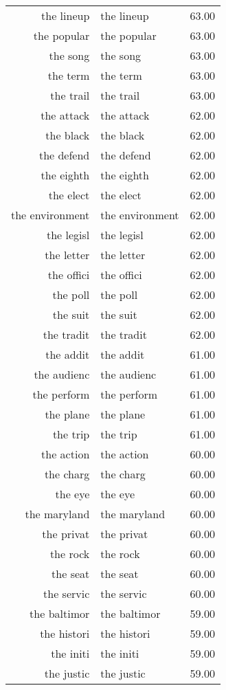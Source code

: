 \begin{table}[ht]
\begin{tabular}{rlr}
  the lineup & the lineup & 63.00 \\ 
  the popular & the popular & 63.00 \\ 
  the song & the song & 63.00 \\ 
  the term & the term & 63.00 \\ 
  the trail & the trail & 63.00 \\ 
  the attack & the attack & 62.00 \\ 
  the black & the black & 62.00 \\ 
  the defend & the defend & 62.00 \\ 
  the eighth & the eighth & 62.00 \\ 
  the elect & the elect & 62.00 \\ 
  the environment & the environment & 62.00 \\ 
  the legisl & the legisl & 62.00 \\ 
  the letter & the letter & 62.00 \\ 
  the offici & the offici & 62.00 \\ 
  the poll & the poll & 62.00 \\ 
  the suit & the suit & 62.00 \\ 
  the tradit & the tradit & 62.00 \\ 
  the addit & the addit & 61.00 \\ 
  the audienc & the audienc & 61.00 \\ 
  the perform & the perform & 61.00 \\ 
  the plane & the plane & 61.00 \\ 
  the trip & the trip & 61.00 \\ 
  the action & the action & 60.00 \\ 
  the charg & the charg & 60.00 \\ 
  the eye & the eye & 60.00 \\ 
  the maryland & the maryland & 60.00 \\ 
  the privat & the privat & 60.00 \\ 
  the rock & the rock & 60.00 \\ 
  the seat & the seat & 60.00 \\ 
  the servic & the servic & 60.00 \\ 
  the baltimor & the baltimor & 59.00 \\ 
  the histori & the histori & 59.00 \\ 
  the initi & the initi & 59.00 \\ 
  the justic & the justic & 59.00 \\ 

\end{tabular}
\end{table}
